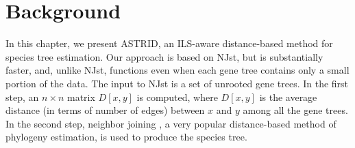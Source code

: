 


\section{Background}


In this chapter, we present ASTRID, an ILS-aware distance-based
method for species tree estimation.  Our approach is based on NJst,
but is substantially faster, and, unlike NJst, functions even when
each gene tree contains only a small portion of the data.  The input
to NJst is a set of unrooted gene trees.
In the first step, an $n \times n$
matrix $D[x,y]$ is computed, where $D[x,y]$ is the average distance
(in terms of number of edges) between $x$ and $y$ among all the gene
trees.  In the second step, neighbor joining \cite{nj}, a very popular
distance-based method of phylogeny estimation, is used to produce the
species tree.  %


